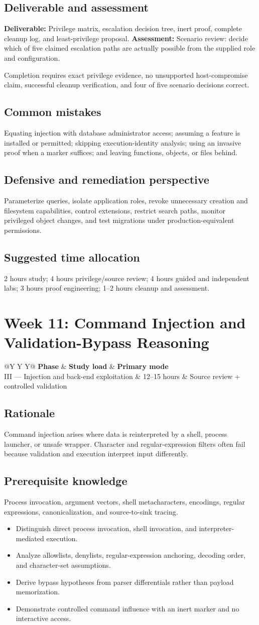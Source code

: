 \documentclass[11pt]{article}
\makeatletter
\newcommand{\weekheader}[4]{%
  \clearpage
  \section{Week #1: #2}
  \begin{tcolorbox}[colback=Navy,colframe=Navy,coltext=white]
    \begin{tabularx}{\linewidth}{@{}Y Y Y@{}}
      \textbf{Phase} & \textbf{Study load} & \textbf{Primary mode}\\
      #3 & #4 hours & Source review + controlled validation
    \end{tabularx}
  \end{tcolorbox}
}
\newcommand{\weekfield}[2]{%
  \Needspace{5\baselineskip}
  \subsection*{#1}
  #2
}
\newcommand{\deliverable}[1]{\textbf{Deliverable:} #1}
\newcommand{\assessment}[1]{\textbf{Assessment:} #1}
\makeatother
\begin{document}
\weekfield{Deliverable and assessment}{\deliverable{Privilege matrix, escalation
decision tree, inert proof, complete cleanup log, and least-privilege proposal.}
\assessment{Scenario review: decide which of five claimed escalation paths are
actually possible from the supplied role and configuration.}}

\begin{checkpoints}
Completion requires exact privilege evidence, no unsupported host-compromise
claim, successful cleanup verification, and four of five scenario decisions
correct.
\end{checkpoints}

\weekfield{Common mistakes}{Equating injection with database administrator
access; assuming a feature is installed or permitted; skipping execution-identity
analysis; using an invasive proof when a marker suffices; and leaving functions,
objects, or files behind.}

\weekfield{Defensive and remediation perspective}{Parameterize queries, isolate
application roles, revoke unnecessary creation and filesystem capabilities,
control extensions, restrict search paths, monitor privileged object changes, and
test migrations under production-equivalent permissions.}

\weekfield{Suggested time allocation}{2 hours study; 4 hours privilege/source
review; 4 hours guided and independent labs; 3 hours proof engineering; 1--2
hours cleanup and assessment.}

\weekheader{11}{Command Injection and Validation-Bypass Reasoning}{III --- Injection and back-end exploitation}{12--15}

\weekfield{Rationale}{Command injection arises where data is reinterpreted by a
shell, process launcher, or unsafe wrapper. Character and regular-expression
filters often fail because validation and execution interpret input differently.}

\weekfield{Prerequisite knowledge}{Process invocation, argument vectors,
shell metacharacters, encodings, regular expressions, canonicalization, and
source-to-sink tracing.}

\begin{objectivebox}
\begin{itemize}
  \item Distinguish direct process invocation, shell invocation, and interpreter-mediated execution.
  \item Analyze allowlists, denylists, regular-expression anchoring, decoding order, and character-set assumptions.
  \item Derive bypass hypotheses from parser differentials rather than payload memorization.
  \item Demonstrate controlled command influence with an inert marker and no interactive access.
\end{itemize}
\end{objectivebox}
\end{document}
